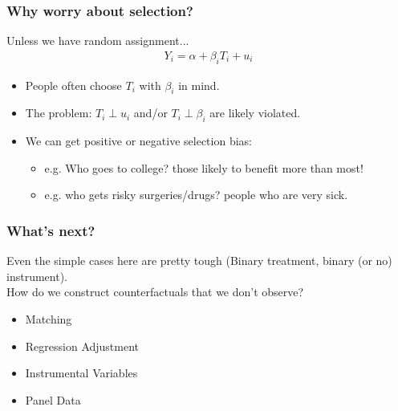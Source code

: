 \documentclass[xcolor=pdftex,dvipsnames,table,mathserif,aspectratio=169]{beamer}
\begin{document}
\begin{frame}
\frametitle{Why worry about selection?}
Unless we have random assignment...
\begin{align*}
Y_i = \alpha + \beta_i T_i + u_i
\end{align*}

\begin{itemize}
\item People often choose $T_i$ with $\beta_i$ in mind.
\item The problem: $T_i \perp u_i$ and/or $T_i \perp \beta_i$ are likely violated.
\item We can get positive or negative selection bias:
\begin{itemize}
\item e.g. Who goes to college? those likely to benefit more than most!
\item e.g. who gets risky surgeries/drugs? people who are very sick.
\end{itemize}
\end{itemize}
\end{frame}

\begin{frame}
\frametitle{What's next?}
Even the simple cases here are pretty tough (Binary treatment, binary (or no) instrument).\\

How do we construct counterfactuals that we don't observe?
\begin{itemize}
\item Matching
\item Regression Adjustment
\item Instrumental Variables
\item Panel Data
\end{itemize}
\end{frame}
\end{document}
